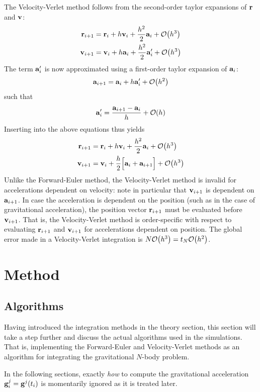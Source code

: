 \documentclass[reprint,english]{revtex4-1}
\begin{document}
The Velocity-Verlet method follows from the second-order taylor expansions of \(\vb{r}\) and \(\vb{v}\):
\begin{subequations}
\begin{align}
\vb{r}_{i+1}&=\vb{r}_i+h\vb{v}_i+\frac{h^2}{2}\vb{a}_i+\order{h^3}\\
\vb{v}_{i+1}&=\vb{v}_i+h\vb{a}_i+\frac{h^2}{2}\vb{a}'_i+\order{h^3}
\end{align}
\end{subequations}
The term \(\vb{a}'_i\) is now approximated using a first-order taylor expansion of \(\vb{a}_i\):
\[\vb{a}_{i+1}=\vb{a}_i+h\vb{a}'_i+\order{h^2}\]
such that
\[\vb{a}'_i=\frac{\vb{a}_{i+1}-\vb{a}_i}{h}+\order{h}\]
Inserting into the above equations thus yields
\begin{subequations}
\begin{align}\label{eq:velocity_verlet_method}
\vb{r}_{i+1}&=\vb{r}_i+h\vb{v}_i+\frac{h^2}{2}\vb{a}_i+\order{h^3}\\
\vb{v}_{i+1}&=\vb{v}_i+\frac{h}{2}\Big[\vb{a}_i+\vb{a}_{i+1}\Big]+\order{h^3}
\end{align}
\end{subequations}
Unlike the Forward-Euler method, the Velocity-Verlet method is invalid for accelerations dependent on velocity: note in particular that \(\vb{v}_{i+1}\) is dependent on \(\vb{a}_{i+1}\). In case the acceleration is dependent on the position (such as in the case of gravitational acceleration), the position vector \(\vb{r}_{i+1}\) must be evaluated before \(\vb{v}_{i+1}\). That is, the Velocity-Verlet method is order-specific with respect to evaluating \(\vb{r}_{i+1}\) and \(\vb{v}_{i+1}\) for accelerations dependent on position. The global error made in a Velocity-Verlet integration is \(N\order{h^3}=t_N\order{h^2}\).
\section{Method}
\subsection{Algorithms}
Having introduced the integration methods in the theory section, this section will take a step further and discuss the actual algorithms used in the simulations. That is, implementing the Forward-Euler and Velocity-Verlet methods as an algorithm for integrating the gravitational \(N\)-body problem.

In the following sections, exactly \emph{how} to compute the gravitational acceleration \(\vb{g}_i^j=\vb{g}^j(t_i)\) is momentarily ignored as it is treated later.
\end{document}
